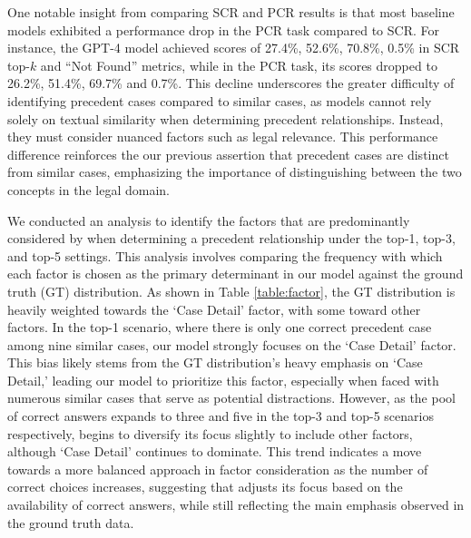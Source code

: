 One notable insight from comparing SCR and PCR results is that most baseline models exhibited a performance drop in the PCR task compared to SCR. For instance, the GPT-4 model achieved scores of 27.4\%, 52.6\%, 70.8\%, 0.5\% in SCR top-$k$ and ``Not Found'' metrics, while in the PCR task, its scores dropped to 26.2\%, 51.4\%, 69.7\% and 0.7\%. This decline underscores the greater difficulty of identifying precedent cases compared to similar cases, as models cannot rely solely on textual similarity when determining precedent relationships. Instead, they must consider nuanced factors such as legal relevance. This performance difference reinforces the our previous assertion that precedent cases are distinct from similar cases, emphasizing the importance of distinguishing between the two concepts in the legal domain.

We conducted an analysis to identify the factors that are predominantly considered by \sysname when determining a precedent relationship under the top-1, top-3, and top-5 settings. This analysis involves comparing the frequency with which each factor is chosen as the primary determinant in our model against the ground truth (GT) distribution. As shown in Table \ref{table:factor}, the GT distribution is heavily weighted towards the `Case Detail' factor, with some toward other factors. In the top-1 scenario, where there is only one correct precedent case among nine similar cases, our model strongly focuses on the `Case Detail' factor. This bias likely stems from the GT distribution's heavy emphasis on `Case Detail,' leading our model to prioritize this factor, especially when faced with numerous similar cases that serve as potential distractions. However, as the pool of correct answers expands to three and five in the top-3 and top-5 scenarios respectively, \sysname begins to diversify its focus slightly to include other factors, although `Case Detail' continues to dominate. This trend indicates a move towards a more balanced approach in factor consideration as the number of correct choices increases, suggesting that \sysname adjusts its focus based on the availability of correct answers, while still reflecting the main emphasis observed in the ground truth data.

